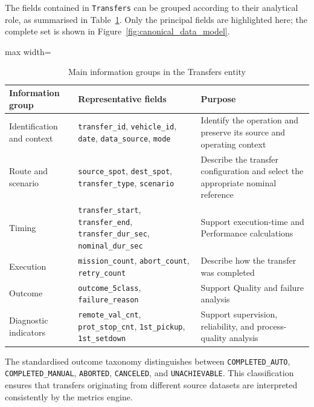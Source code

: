 The fields contained in \texttt{Transfers} can be grouped according to their analytical role, as summarised in Table~\ref{tab:transfers-information-groups}. Only the principal fields are highlighted here; the complete set is shown in Figure~\ref{fig:canonical_data_model}.

\begin{table}[H]
\small
\renewcommand{\arraystretch}{1.3}
\centering
\caption{Main information groups in the Transfers entity}
\label{tab:transfers-information-groups}
\begin{adjustbox}{max width=\textwidth}
\begin{tabular}{|p{3.2cm}|p{5.8cm}|p{8cm}|}
\hline
\textbf{Information group} & \textbf{Representative fields} & \textbf{Purpose} \\
\hline
Identification and context & \texttt{transfer\_id}, \texttt{vehicle\_id}, \texttt{date}, \texttt{data\_source}, \texttt{mode} & Identify the operation and preserve its source and operating context \\
\hline
Route and scenario & \texttt{source\_spot}, \texttt{dest\_spot}, \texttt{transfer\_type}, \texttt{scenario} & Describe the transfer configuration and select the appropriate nominal reference \\
\hline
Timing & \texttt{transfer\_start}, \texttt{transfer\_end}, \texttt{transfer\_dur\_sec}, \texttt{nominal\_dur\_sec} & Support execution-time and Performance calculations \\
\hline
Execution & \texttt{mission\_count}, \texttt{abort\_count}, \texttt{retry\_count} & Describe how the transfer was completed \\
\hline
Outcome & \texttt{outcome\_5class}, \texttt{failure\_reason} & Support Quality and failure analysis \\
\hline
Diagnostic indicators & \texttt{remote\_val\_cnt}, \texttt{prot\_stop\_cnt}, \texttt{1st\_pickup}, \texttt{1st\_setdown} & Support supervision, reliability, and process-quality analysis \\
\hline
\end{tabular}
\end{adjustbox}
\end{table}

The standardised outcome taxonomy distinguishes between \texttt{COMPLETED\_AUTO}, \texttt{COMPLETED\_MANUAL}, \texttt{ABORTED}, \texttt{CANCELED}, and \texttt{UNACHIEVABLE}. This classification ensures that transfers originating from different source datasets are interpreted consistently by the metrics engine.


